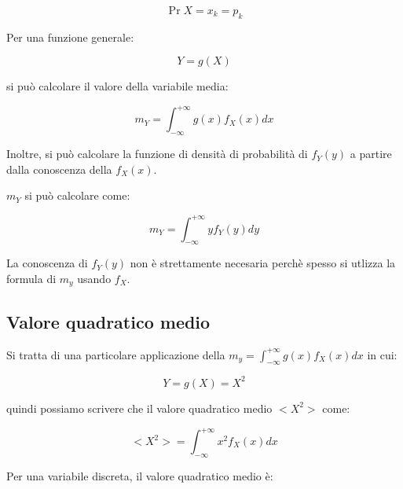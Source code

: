 {
    \Large 
    \begin{equation}
        \Pr{X = x_k} = p_k
    \end{equation}
}

Per una funzione generale: 

{
    \Large 
    \begin{equation}
        Y = g(X)
    \end{equation}
} 

si può calcolare il valore della variabile media:

{
    \Large 
    \begin{equation}
        m_Y 
        = 
        \int_{- \infty}^{+ \infty} 
        g(x) f_X (x) dx 
    \end{equation}
}

Inoltre, si può calcolare la funzione di densità di probabilità di $f_Y (y)$ 
a partire dalla conoscenza della $f_X (x)$. \newline 

$m_Y$ si può calcolare come: 

{
    \Large 
    \begin{equation}
        m_Y 
        = 
        \int_{-\infty}^{+ \infty}
        y f_Y (y) dy
    \end{equation}
}


La conoscenza di $f_Y (y)$ non è strettamente necesaria perchè spesso si utlizza la formula 
di $m_y$ usando $f_X$. \newline 

\subsection{Valore quadratico medio} 

Si tratta di una particolare applicazione della $m_y = \int_{-\infty}^{+\infty} g(x) f_X (x) dx$ in cui: 

{
    \Large 
    \begin{equation}
        Y = g(X) = X^{2}
    \end{equation}
}

quindi possiamo scrivere che il valore quadratico medio $<X^{2}>$ come:

{
    \Large 
    \begin{equation}
        <X^{2}> = \int_{-\infty}^{+ \infty} x^{2} f_X (x) dx
    \end{equation}
}

Per una variabile discreta, il valore quadratico medio è: 

